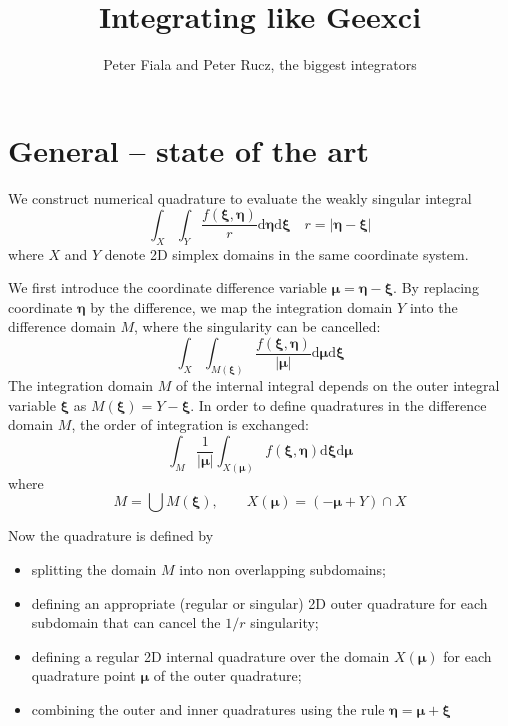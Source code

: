 \documentclass[a4paper,10pt,twocolumn]{article}
\author{Peter Fiala and Peter Rucz, the biggest integrators}
\title{Integrating like Geexci}
\newcommand{\td}{\mathrm{d}}
\begin{document}
\maketitle

\section{General -- state of the art}

We construct numerical quadrature to evaluate the weakly singular integral
%
\begin{equation}
\int_X
\int_Y
\frac{f(\bm{\xi},\bm{\eta})}{r}
\td \bm{\eta}
\td \bm{\xi}
\quad
r = |\bm{\eta}-\bm{\xi}|
\end{equation}
%
where $X$ and $Y$ denote 2D simplex domains in the same coordinate system.


We first introduce the coordinate difference variable $\bm{\mu} = \bm{\eta}-\bm{\xi}$.
By replacing coordinate $\bm{\eta}$ by the difference, we map the integration domain $Y$ into the difference domain $M$, where the singularity can be cancelled:
%
\begin{equation}
\int_X
\int_{M(\bm{\xi})}
\frac{f(\bm{\xi},\bm{\eta})}{|\bm{\mu}|}
\td \bm{\mu}
\td \bm{\xi}
\end{equation}
%
The integration domain $M$ of the internal integral depends on the outer integral variable $\bm{\xi}$ as $M(\bm{\xi}) = Y - \bm{\xi}$. In order to define quadratures in the difference domain $M$, the order of integration is exchanged:
%
\begin{equation}
\int_{M}
\frac{1}{|\bm{\mu}|}
\int_{X(\bm{\mu})}
f(\bm{\xi},\bm{\eta})
\td \bm{\xi}
\td \bm{\mu}
\end{equation}
%
where
%
\begin{equation}
M = \bigcup M(\bm{\xi}),
\qquad
X({\bm{\mu}}) = (-\bm{\mu} + Y) \cap X
\end{equation}

Now the quadrature is defined by
\begin{itemize}
	\item splitting the domain $M$ into non overlapping subdomains;
	\item defining an appropriate (regular or singular) 2D outer quadrature for each subdomain that can cancel the $1/r$ singularity;
	\item defining a regular 2D internal quadrature over the domain $X(\bm{\mu})$ for each quadrature point $\bm{\mu}$ of the outer quadrature;
	\item combining the outer and inner quadratures using the rule $\bm{\eta} = \bm{\mu} + \bm{\xi}$
\end{itemize}
\end{document}
